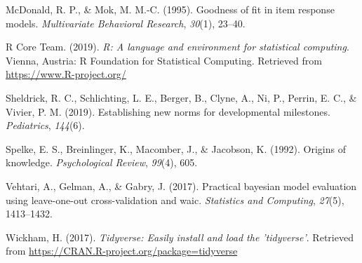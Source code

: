 \documentclass[10pt, letterpaper]{article}
\begin{document}
\leavevmode\hypertarget{ref-mcdonald1995goodness}{}%
McDonald, R. P., \& Mok, M. M.-C. (1995). Goodness of fit in item
response models. \emph{Multivariate Behavioral Research}, \emph{30}(1),
23--40.

\leavevmode\hypertarget{ref-rcore}{}%
R Core Team. (2019). \emph{R: A language and environment for statistical
computing}. Vienna, Austria: R Foundation for Statistical Computing.
Retrieved from \url{https://www.R-project.org/}

\leavevmode\hypertarget{ref-sheldrick2019establishing}{}%
Sheldrick, R. C., Schlichting, L. E., Berger, B., Clyne, A., Ni, P.,
Perrin, E. C., \& Vivier, P. M. (2019). Establishing new norms for
developmental milestones. \emph{Pediatrics}, \emph{144}(6).

\leavevmode\hypertarget{ref-spelke1992origins}{}%
Spelke, E. S., Breinlinger, K., Macomber, J., \& Jacobson, K. (1992).
Origins of knowledge. \emph{Psychological Review}, \emph{99}(4), 605.

\leavevmode\hypertarget{ref-vehtari2017practical}{}%
Vehtari, A., Gelman, A., \& Gabry, J. (2017). Practical bayesian model
evaluation using leave-one-out cross-validation and waic.
\emph{Statistics and Computing}, \emph{27}(5), 1413--1432.

\leavevmode\hypertarget{ref-tidy}{}%
Wickham, H. (2017). \emph{Tidyverse: Easily install and load the
'tidyverse'}. Retrieved from
\url{https://CRAN.R-project.org/package=tidyverse}


\end{document}
